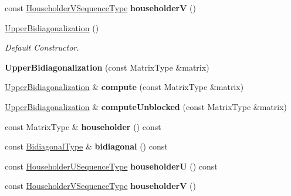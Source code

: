 \begin{DoxyCompactItemize}
\mbox{\label{class_eigen_1_1internal_1_1_upper_bidiagonalization_a6ab970ae51909e56ceb63a49e06fdc98}} 
const \hyperlink{group___householder___module_class_eigen_1_1_householder_sequence}{Householder\+V\+Sequence\+Type} {\bfseries householderV} ()
\item 
\hyperlink{class_eigen_1_1internal_1_1_upper_bidiagonalization_aa37a7ca5f5e86e3efbc6907d03d89340}{Upper\+Bidiagonalization} ()
\begin{DoxyCompactList}\small\item\em Default Constructor. \end{DoxyCompactList}\item 
\mbox{\label{class_eigen_1_1internal_1_1_upper_bidiagonalization_a0be89ad4d54df169e3607031e0284e20}} 
{\bfseries Upper\+Bidiagonalization} (const Matrix\+Type \&matrix)
\item 
\mbox{\label{class_eigen_1_1internal_1_1_upper_bidiagonalization_af4f3ea41c822c1aaacb4b1a6e9ddd218}} 
\hyperlink{class_eigen_1_1internal_1_1_upper_bidiagonalization}{Upper\+Bidiagonalization} \& {\bfseries compute} (const Matrix\+Type \&matrix)
\item 
\mbox{\label{class_eigen_1_1internal_1_1_upper_bidiagonalization_a55b6ba4a89f164415a722e8ff968edc9}} 
\hyperlink{class_eigen_1_1internal_1_1_upper_bidiagonalization}{Upper\+Bidiagonalization} \& {\bfseries compute\+Unblocked} (const Matrix\+Type \&matrix)
\item 
\mbox{\label{class_eigen_1_1internal_1_1_upper_bidiagonalization_ace16851d1d267d8f86caabdba8b56dfa}} 
const Matrix\+Type \& {\bfseries householder} () const
\item 
\mbox{\label{class_eigen_1_1internal_1_1_upper_bidiagonalization_a970d328a7b5fd3ad7ee9dd42c9952577}} 
const \hyperlink{group___core___module}{Bidiagonal\+Type} \& {\bfseries bidiagonal} () const
\item 
\mbox{\label{class_eigen_1_1internal_1_1_upper_bidiagonalization_a39887f7712de5be5a0487e9f6357b9da}} 
const \hyperlink{group___householder___module_class_eigen_1_1_householder_sequence}{Householder\+U\+Sequence\+Type} {\bfseries householderU} () const
\item 
\mbox{\label{class_eigen_1_1internal_1_1_upper_bidiagonalization_a6ab970ae51909e56ceb63a49e06fdc98}} 
const \hyperlink{group___householder___module_class_eigen_1_1_householder_sequence}{Householder\+V\+Sequence\+Type} {\bfseries householderV} ()
\end{DoxyCompactItemize}
